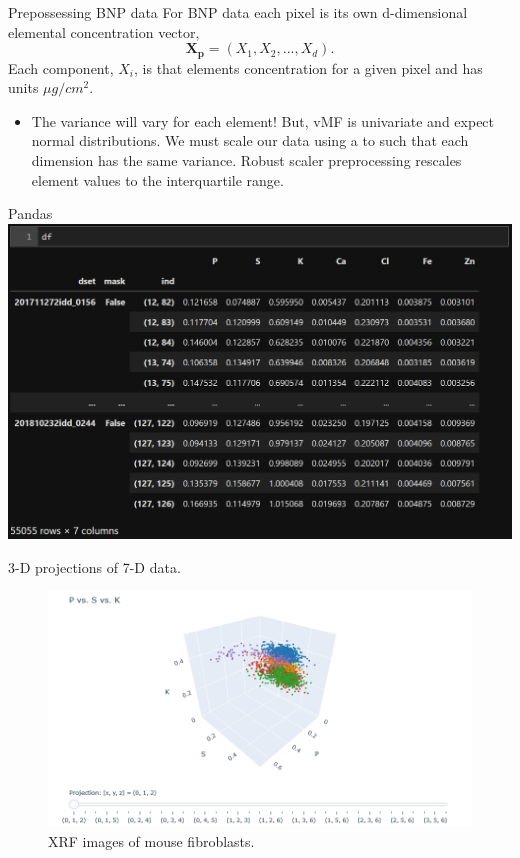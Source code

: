 \documentclass[
]{beamer}
\begin{document}
\begin{frame}{Prepossessing BNP data}
For BNP data each pixel is its own d-dimensional elemental concentration vector, 
$$\boldsymbol{X_p} = (X_1, X_2, ..., X_d).$$
Each component, $X_i$, is that elements concentration for a given pixel and has units $\mu g/cm^2$. 

\begin{itemize}
    \item The variance will vary for each element! But, vMF is univariate and expect normal distributions. We must scale our data using a to such that each dimension has the same variance. Robust scaler preprocessing rescales element values to the interquartile range.
\end{itemize}
    
\end{frame}

\begin{frame}{Pandas}
    \includegraphics[width=1\textwidth,height=.7\textheight,keepaspectratio]{dataframe.PNG}
    \caption{Multiindex Pandas dataframe for storing data and labels.}
\end{frame}

\begin{frame}{3-D projections of 7-D data.}
\begin{figure}[h]
  \includegraphics[width=1\textwidth,height=1\textheight,keepaspectratio]{7dto3d.png}
  \caption{XRF images of mouse fibroblasts.}
\end{figure}
\end{frame}
\end{document}

